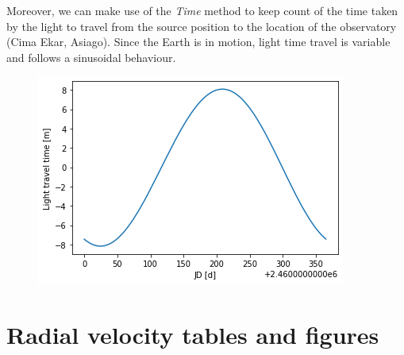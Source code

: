 \documentclass[a4paper,11pt,twocolumn]{article}
\begin{document}
Moreover, we can make use of the \textit{Time} method to keep count of the time 
taken by the light to travel from the source position to the location of the 
observatory (Cima Ekar, Asiago). Since the Earth is in motion, light time 
travel is variable and follows a sinusoidal behaviour.
\begin{figure}[H]
    \centering  
    \includegraphics[scale=0.55, angle=0]{../pictures/time_corr.png}
\end{figure}


\section{Radial velocity tables and figures}
\label{sect:app_C}
\end{document}
